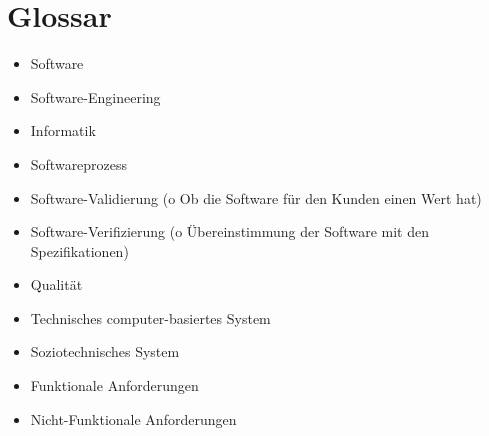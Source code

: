 \chapter{Glossar}
\begin{itemize}
\item Software
\item Software-Engineering
\item Informatik
\item Softwareprozess
\item Software-Validierung (o	Ob die Software für den Kunden einen Wert hat)
\item Software-Verifizierung (o	Übereinstimmung der Software mit den Spezifikationen)
\item Qualität
\item Technisches computer-basiertes System
\item Soziotechnisches System
\item Funktionale Anforderungen
\item Nicht-Funktionale Anforderungen

\end{itemize}